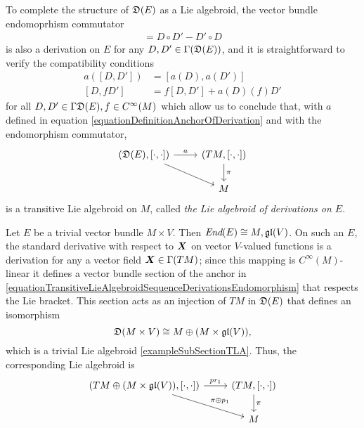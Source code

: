 To complete the structure of $\mathfrak{D}(E)$ as a Lie algebroid, the vector bundle endomoprhism commutator
\begin{align*}
    [D, D'] = D \circ D' - D' \circ D
\end{align*}
is also a derivation on $E$ for any $D, D' \in \Gamma(\mathfrak{D}(E))$, and it is straightforward to verify the compatibility conditions
\begin{align}
    a([D, D']) &= [a(D), a(D')] \\
    [D, f D'] &= f[D, D'] + a(D)(f) D'
\end{align}
for all $D, D' \in \Gamma \mathfrak{D}(E), f \in C^\infty(M)$ which allow us to conclude that, with $a$ defined in equation \eqref{equationDefinitionAnchorOfDerivation} and with the endomorphism commutator,
\begin{equation}
    \begin{tikzcd}
    (\alg D(E), [\cdot, \cdot]) \arrow{r}{a} \arrow{dr}{} & (TM, [\cdot, \cdot]) \arrow{d}{\pi}\\
    & M
    \end{tikzcd}
\end{equation}
is a transitive Lie algebroid on $M$, called \emph{the Lie algebroid of derivations on $E$}.

\begin{example}
\label{exampleDerivationsLieAlgebroidOfATrivialVectorBundleglV}
Let $E$ be a trivial vector bundle $M \times V$. Then $\operatorname{\textit{End}}(E) \cong M, \mathfrak{gl}(V)$. On such an $E$, the standard derivative with respect to $\bm{X}$ on vector $V$-valued functions is a derivation for any a vector field $\bm{X} \in \Gamma(TM)$; since this mapping is $C^\infty(M)$-linear it defines a vector bundle section of the anchor in \ref{equationTransitiveLieAlgebroidSequenceDerivationsEndomorphism} that respects the Lie bracket. This section acts as an injection of $TM$ in $\mathfrak{D}(E)$ that defines an isomorphism
\begin{equation}
    \mathfrak{D}(M \times V) \cong M \oplus (M \times \mathfrak{gl}(V)),
\end{equation}
which is a trivial Lie algebroid \ref{exampleSubSectionTLA}.
Thus, the corresponding Lie algebroid is
\begin{equation}
    \begin{tikzcd}
    (TM \oplus (M \times \alg{gl}(V)), [\cdot, \cdot]) \arrow{r}{pr_1} \arrow{dr}{\pi\oplus p_1} & (TM, [\cdot, \cdot]) \arrow{d}{\pi}\\
    & M
    \end{tikzcd}
\end{equation}
\end{example}


